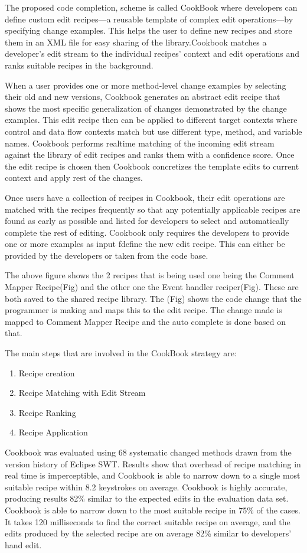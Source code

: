 \documentclass[10pt, conference, compsocconf]{IEEEtran}
\begin{document}
 The proposed code completion, scheme is called CookBook where developers can define custom edit recipes—a reusable template of complex edit operations—by specifying change examples. This helps the user to define new recipes and store them in an XML file for easy sharing of the library.Cookbook matches a developer’s edit stream to the individual recipes’ context and edit operations
and ranks suitable recipes in the background.

When a user provides one or more method-level change examples by selecting their old and new versions,
Cookbook generates an abstract edit recipe that shows the most specific generalization of changes demonstrated by the
change examples. This edit recipe then can be applied to different target contexts where control and data flow contexts
match but use different type, method, and variable names. Cookbook performs realtime matching of the incoming edit stream against the library of edit recipes and ranks them with a confidence score. Once the edit recipe is chosen then Cookbook concretizes the template edits to current context and apply rest of the changes.

Once users have a collection of recipes in Cookbook, their edit operations are matched with the recipes frequently so that any potentially applicable recipes are found as early as possible and listed for developers to select and automatically complete the rest of editing. Cookbook only requires the developers to provide one or more examples as input fdefine the new edit recipe. This can either be provided by the developers or taken from the code base.

The above figure shows the 2 recipes that is being used one being the Comment Mapper Recipe(Fig) and the other one the Event handler reciper(Fig). These are both saved to the shared recipe library. The (Fig) shows the code change that the programmer is making and maps this to the edit recipe. The change made is mapped to Comment Mapper Recipe and the auto complete is done based on that.

The main steps that are involved in the CookBook strategy are:
\begin{enumerate}
\item Recipe creation
\item Recipe Matching with Edit Stream
\item Recipe Ranking
\item Recipe Application
\end{enumerate}


Cookbook was evaluated using 68 systematic changed methods drawn from the version history of Eclipse SWT.
Results show that overhead of recipe matching in real time is imperceptible, and Cookbook is able to narrow down to a single most suitable recipe within 8.2 keystrokes on average. Cookbook is highly accurate, producing results 82\% similar to the expected edits in the evaluation data set.  Cookbook is able to narrow down to the most suitable recipe in 75\% of the cases. It takes 120 milliseconds to find the correct suitable recipe on average, and the edits produced by the selected recipe are on average 82\% similar to developers’ hand edit.
\end{document}
